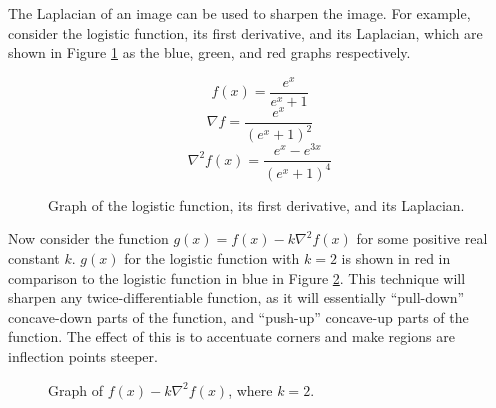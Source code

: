The Laplacian of an image can be used to sharpen the image. For example, consider the logistic function, its first derivative, and its Laplacian, which are shown in Figure \ref{fig:laplacian} as the blue, green, and red graphs respectively.

\[f(x) = \frac{e^x}{e^x + 1}\]
\[\nabla{f} = \frac{e^x}{(e^x + 1)^2}\]
\[\nabla^2f(x) = \frac{e^x - e^{3x}}{(e^x + 1)^4}\]

\begin{figure}[ht!]
    \centering
\caption{Graph of the logistic function, its first derivative, and its Laplacian.}
\label{fig:laplacian}
\end{figure}

Now consider the function $g(x) = f(x) - k\nabla^2f(x)$ for some positive real constant $k$. $g(x)$ for the logistic function with $k=2$ is shown in red in comparison to the logistic function in blue in Figure \ref{fig:laplacian-sharpening}. This technique will sharpen any twice-differentiable function, as it will essentially ``pull-down'' concave-down parts of the function, and ``push-up'' concave-up parts of the function. The effect of this is to accentuate corners and make regions are inflection points steeper.

\begin{figure}[ht!]
    \centering
\caption{Graph of $f(x) - k\nabla^2f(x)$, where $k=2$.}
\label{fig:laplacian-sharpening}
\end{figure}


